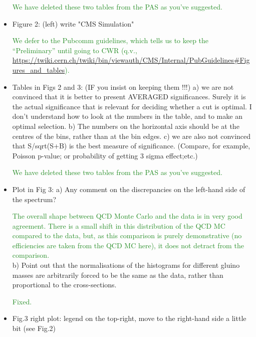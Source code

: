 \documentclass[paper=a4, fontsize=11pt]{scrartcl}
\begin{document}
\begin{itemize}
\textcolor{ForestGreen}{We have deleted these two tables from the PAS as you've suggested.}\\


\item Figure 2: 
(left) write "CMS Simulation" 

\textcolor{ForestGreen}{We defer to the Pubcomm guidelines, which tells us to keep the
``Preliminary'' until going to CWR (q.v.,
	\url{https://twiki.cern.ch/twiki/bin/viewauth/CMS/Internal/PubGuidelines\#Figures_and_tables}).}\\


\item Tables in Figs 2 and 3: (IF you insist on keeping them !!!) 
a) we are not convinced that it is better to present AVERAGED significances. 
Surely it is the actual significance that is relevant for deciding whether 
a cut is optimal. I don't understand how to look at the numbers in the table, 
and to make an optimal selection. 
b) The numbers on the horizontal axis should be at the centres of the bins, 
rather than at the bin edges. 
c) we are also not convinced that S/sqrt(S+B) is the best measure of 
significance. (Compare, for example, Poisson p-value; or probability of 
getting 3 sigma effect;etc.) 

\textcolor{ForestGreen}{We have deleted these two tables from the PAS as you've suggested.}\\


\item Plot in Fig 3: 
a) Any comment on the discrepancies on the left-hand side of the spectrum? 

\textcolor{ForestGreen}{The overall shape between QCD Monte Carlo and the
data is in very good agreement. There is a small shift in this distribution of the
QCD MC compared to the data, but, as this comparison is purely demonstrative
(no efficiencies are taken from the QCD MC here), it does not detract from
the comparison.}\\


b) Point out that the normalisations of the histograms for different gluino 
masses are arbitrarily forced to be the same as the data, rather than 
proportional to the cross-sections. 

\textcolor{ForestGreen}{Fixed.}\\


\item Fig.3 
right plot: legend on the top-right, move to the right-hand side a little 
bit (see Fig.2) 


\end{itemize}
\end{document}
